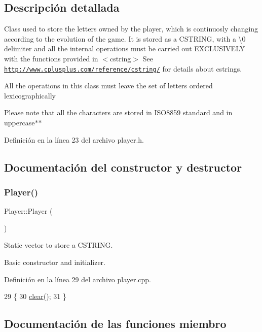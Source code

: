 \subsection{Descripción detallada}
Class used to store the letters owned by the player, which is continuosly changing according to the evolution of the game. It is stored as a C\+S\+T\+R\+I\+NG, with a \textbackslash{}0 delimiter and all the internal operations must be carried out E\+X\+C\+L\+U\+S\+I\+V\+E\+LY with the functions provided in $<$cstring$>$ See \href{http://www.cplusplus.com/reference/cstring/}{\tt http\+://www.\+cplusplus.\+com/reference/cstring/} for details about cstrings. 

All the operations in this class must leave the set of letters ordered lexicographically

Please note that all the characters are stored in I\+S\+O8859 standard and in uppercase$\ast$$\ast$ 

Definición en la línea 23 del archivo player.\+h.



\subsection{Documentación del constructor y destructor}
\mbox{\label{classPlayer_affe0cc3cb714f6deb4e62f0c0d3f1fd8}} 
\subsubsection{\texorpdfstring{Player()}{Player()}}
{\footnotesize\ttfamily Player\+::\+Player (\begin{DoxyParamCaption}{ }\end{DoxyParamCaption})}



Static vector to store a C\+S\+T\+R\+I\+NG. 

Basic constructor and initializer. 

Definición en la línea 29 del archivo player.\+cpp.


\begin{DoxyCode}
29                \{
30     \hyperlink{classPlayer_af1dda5581f5f56c61bac0cf07a300bdd}{clear}();
31 \}
\end{DoxyCode}


\subsection{Documentación de las funciones miembro}
\mbox{\label{classPlayer_a27777d29645eaef87edb912216dcf439}} 
